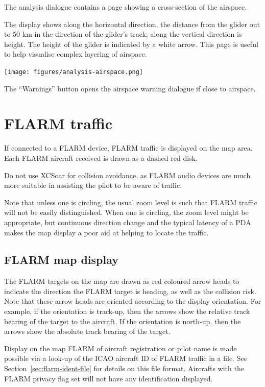 The analysis dialogue contains a page showing a cross-section of the
airspace. 

The display shows along the horizontal direction, the
distance from the glider out to 50 km in the direction of the glider's
track; along the vertical direction is height.  The height of the
glider is indicated by a white arrow.  This page is useful to help
visualise complex layering of airspace.

\begin{center}
\texttt{[image: figures/analysis-airspace.png]}
\end{center}

The ``Warnings'' button opens the airspace warning dialogue if close to
airspace.

\section{FLARM traffic}

If connected to a FLARM device, FLARM traffic is displayed on the map
area.  Each FLARM aircraft received is drawn as a dashed red disk.

\warning Do not use XCSoar for collision avoidance, as
FLARM audio devices are much more suitable in assisting the pilot to be
aware of traffic.

Note that unless one is circling, the usual zoom level is such that
FLARM traffic will not be easily distinguished. When one is circling,
the zoom level might be appropriate, but continuous direction change and
the typical latency of a PDA makes the map display a poor aid at helping
to locate the traffic.

\subsection*{FLARM map display}

The FLARM targets on the map are drawn as red coloured 
arrow heads to indicate the direction the FLARM target is
heading, as well as the collision risk.  Note that these
arrow heads are oriented according to the display orientation.  For example, if 
the orientation is track-up, then the arrows show the relative track bearing of
the target to the aircraft.  If the orientation is north-up, then the arrows show the
absolute track bearing of the target.

Display on the map FLARM of aircraft registration or pilot name is
made possible via a look-up of the ICAO aircraft ID of FLARM traffic
in a file.  See Section~\ref{sec:flarm-ident-file} for details on this
file format.  Aircrafts with the FLARM privacy flag set will not have
any identification displayed.

